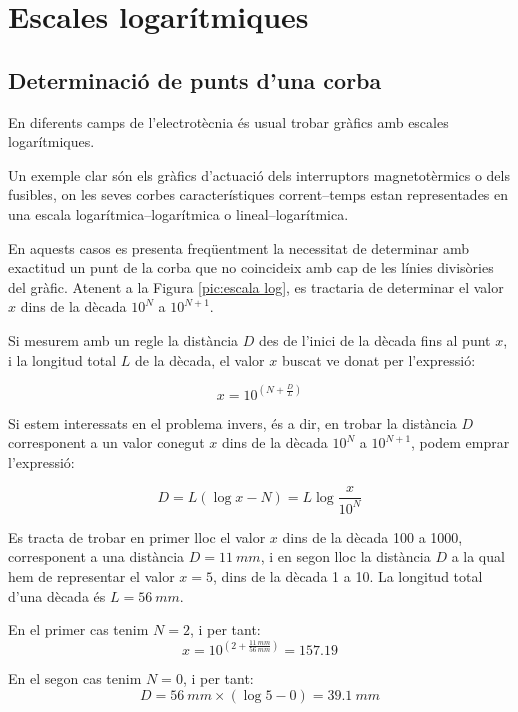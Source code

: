 \section{Escales logarítmiques}\label{sec:escales-log} 

\subsection{Determinació de punts d'una corba}

En diferents camps de l'electrotècnia és usual trobar gràfics amb escales
logarítmiques.

Un exemple clar són els gràfics d'actuació dels interruptors magnetotèrmics o dels
fusibles, on les seves corbes característiques corrent--temps estan representades en
una escala logarítmica--logarítmica o lineal--logarítmica.

En aquests casos es presenta freqüentment la necessitat de determinar amb exactitud un
punt de la corba que no coincideix amb cap de les línies divisòries del gràfic. Atenent a
la Figura \vref{pic:escala log}, es tractaria de determinar el valor $x$ dins de la dècada
$10^N$ a $10^{N+1}$.

\begin{center}
    
    \label{pic:escala log}
\end{center}

Si mesurem amb un regle la distància $D$ des de l'inici de la dècada fins al punt $x$, i
la longitud total $L$ de la dècada, el valor $x$ buscat ve donat per l'expressió:

\begin{equation}
    x = 10^{\left(N+\frac{D}{L}\right)}
\end{equation}

Si estem interessats en el problema invers, és a dir, en  trobar la distància $D$
corresponent a un valor conegut $x$ dins de la dècada $10^N$ a $10^{N+1}$, podem emprar
l'expressió:

\begin{equation}
    D = L(\log x - N) = L \log\frac{x}{10^N}
\end{equation}

\begin{exemple}
    Es tracta de trobar en primer lloc el valor $x$ dins de la dècada 100 a 1000, corresponent a una
    distància $D=\SI{11}{mm}$, i en segon lloc la distància $D$ a la qual hem de representar el valor $x=5$, dins de la
    dècada 1 a 10. La longitud total d'una dècada és $L=\SI{56}{mm}$.

    En el primer cas tenim $N=2$, i per tant:
    \[
        x = 10^{\left(2+\frac{\SI{11}{mm}}{\SI{56}{mm}}\right)}= \num{157,19}
    \]

    En el segon cas tenim $N=0$, i per tant:
    \[
        D = \SI{56}{mm} \times (\log 5 - 0)  = \SI{39,1}{mm}
    \]

\end{exemple}


